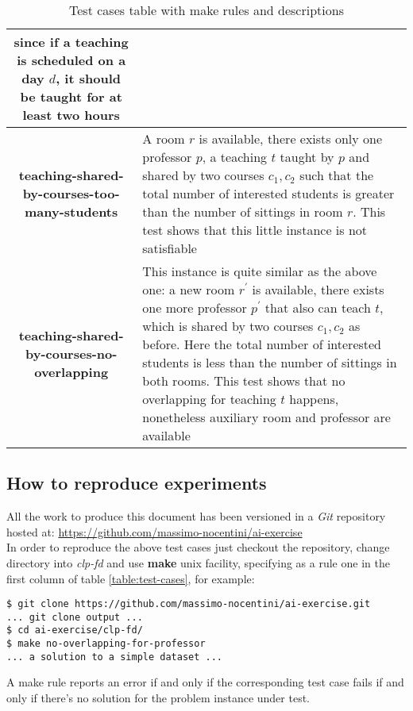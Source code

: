 \documentclass[10pt,a4paper]{article} %
\begin{document}
\begin{table}
\begin{tabular}{ c | p{6cm} }
                since if a teaching is scheduled on a day $d$, it should be taught
                for at least two hours \\
            \hline
            \textbf{teaching-shared-by-courses-too-many-students} &
                A room $r$ is available,
                there exists only one professor $p$, a teaching $t$ taught by $p$
                and shared by two courses $c_1, c_2$ such that the total number
                of interested students is greater than the number of sittings in
                room $r$.
                This test shows that this little instance is not satisfiable \\
            \hline
            \textbf{teaching-shared-by-courses-no-overlapping} &
                This instance is quite similar as the above one: a new
                room $r^\prime$ is available, there exists one more professor
                $p^\prime$ that also can teach $t$, which is shared by two
                courses $c_1, c_2$ as before. Here the total number
                of interested students is less than the number of sittings in
                both rooms. This test shows that no overlapping for teaching $t$
                happens, nonetheless auxiliary room and professor are available \\
            \end{tabular}

        \caption{Test cases table with make rules and descriptions}
    \end{table}

    \subsection{How to reproduce experiments}
    All the work to produce this document has been versioned in a
    \emph{Git} repository hosted at:
    \url{https://github.com/massimo-nocentini/ai-exercise}\\
    In order to reproduce the above test cases just checkout the
    repository, change directory into \emph{clp-fd} and use \textbf{make}
    unix facility, specifying as a rule one in the first column of table
    \ref{table:test-cases}, for example:
    \begin{verbatim}
$ git clone https://github.com/massimo-nocentini/ai-exercise.git
... git clone output ...
$ cd ai-exercise/clp-fd/
$ make no-overlapping-for-professor
... a solution to a simple dataset ...
    \end{verbatim}
    A make rule reports an error if and only if the corresponding
    test case fails if and only if there's no solution for the
    problem instance under test.
\end{document}
